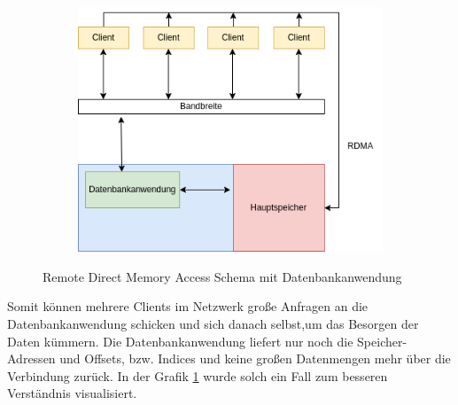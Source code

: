 \begin{figure}[h]
  \centering
  \begin{subfigure}[b]{0.5\textwidth}
    \includegraphics[width=1.0\linewidth]{img/rdma}
  \end{subfigure}
  \caption{Remote Direct Memory Access Schema mit Datenbankanwendung}
  \label{graf6}
\end{figure}

Somit können mehrere Clients im Netzwerk große Anfragen an die Datenbankanwendung schicken und sich danach selbst,um das Besorgen der Daten kümmern. Die Datenbankanwendung liefert nur noch die Speicher-Adressen und Offsets, bzw. Indices und keine großen Datenmengen mehr über die Verbindung zurück. In der Grafik \ref{graf6} wurde solch ein Fall zum besseren Verständnis visualisiert.







